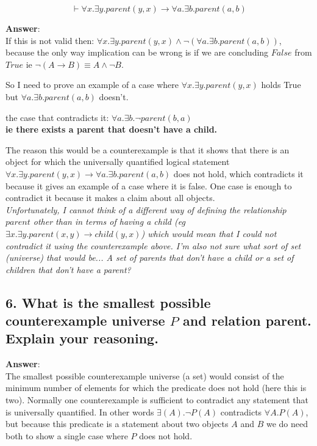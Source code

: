 \documentclass[a4paper, 14pt]{report}
\newcommand{\answer}[1]{%
	\begin{flushleft}
		\textbf{Answer}:\\
			#1
	\end{flushleft}}
\newcommand{\question}[1]{\subsection*{#1}}
\begin{document}
\[ 
	\vdash \forall{x}.\exists{y}.parent(y, x) \rightarrow \forall{a}.\exists{b}.parent(a, b) 
\]

\answer{If this is not valid then:
	$ \forall{x}.\exists{y}.parent(y, x) \wedge \neg (\forall{a}.\exists{b}.parent(a, b)) $,
	because the only way implication can be wrong is if we are concluding
	$False$ from $True$ ie $ \neg (A \rightarrow B) \equiv A \wedge \neg B$.

	So I need to prove an example of a case where 
	$\forall{x}.\exists{y}.parent(y, x)$ holds True but 
	$\forall{a}.\exists{b}.parent(a, b)$ doesn't.\

	\begin{flushleft}
		the case that contradicts it: $\forall{a}.\exists{b}.\neg parent(b, a)$ \\
		\textbf{ie there exists a parent that doesn't have a child.}
	\end{flushleft}

	The reason this would be a counterexample is that it shows that
	there is an object for which the universally quantified logical statement 
	$\forall{x}.\exists{y}.parent(y, x) \rightarrow \forall{a}.\exists{b}.parent(a, b)$
	does not hold, which contradicts it because it gives an example of a case where it is false. One case is enough to contradict it because it makes a claim about all objects. \\

	\textit{Unfortunately, I cannot think of a different way of defining the relationship $parent$
		other than in terms of having a child (eg $\exists{x}.\exists{y}.parent(x, y) \rightarrow child(y, x)$) 
		which would mean that I could not contradict it using the counterexample above. 
		I'm also not sure what sort of set (universe) that would be... A
		set of parents that don't have a child or a set of children that
		don't have a parent?}
}

\pagebreak

\question{6. What is the smallest possible counterexample universe $ P $ and relation parent. Explain your reasoning.}

\answer{The smallest possible counterexample universe (a set) would consist
	of the minimum number of elements for which the predicate does not hold (here this is two). 
	Normally one counterexample  is sufficient to contradict any
  statement that is universally quantified. In other words $\exists(A).\neg P(A)$ 
  contradicts $\forall{A}.P(A)$, but because this predicate is a statement
  about two objects $A$ and $B$ we do need both to show a single case where
  $P$ does not hold.}
\end{document}
